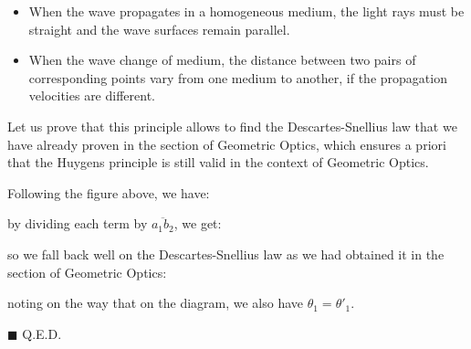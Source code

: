 	\begin{itemize}
		\item When the wave propagates in a homogeneous medium, the light rays must be straight and the wave surfaces remain parallel.

		\item When the wave change of medium, the distance between two pairs of corresponding points vary from one medium to another, if the propagation velocities are different.
	\end{itemize}
	\begin{theorem}
	Let us prove that this principle allows to find the Descartes-Snellius law that we have already proven in the section of Geometric Optics, which ensures a priori that the Huygens principle is still valid in the context of Geometric Optics.
	\end{theorem}
	\begin{dem}
	Following the figure above, we have:
	
	by dividing each term by $\overline{a_1b_2}$, we get:
	
	so we fall back well on the Descartes-Snellius law as we had obtained it in the section of Geometric Optics:
	
	noting on the way that on the diagram, we also have $\theta_1={\theta'}_1$.
	\begin{flushright}
		$\blacksquare$  Q.E.D.
	\end{flushright}
	\end{dem}
	
